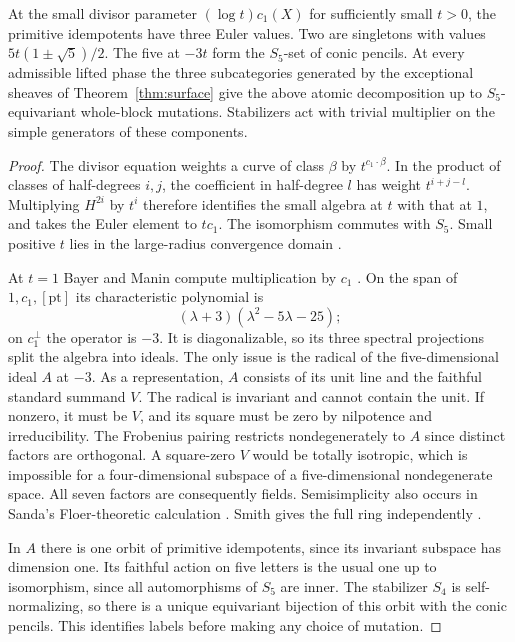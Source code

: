 \begin{proposition}\label{prop:quintic}
At the small divisor parameter $(\log t)c_1(X)$ for sufficiently small $t>0$, the primitive idempotents have three Euler values. Two are singletons with values $5t(1\pm\sqrt5)/2$. The five at $-3t$ form the $S_5$-set of conic pencils. At every admissible lifted phase the three subcategories generated by the exceptional sheaves of Theorem~\ref{thm:surface} give the above atomic decomposition up to $S_5$-equivariant whole-block mutations. Stabilizers act with trivial multiplier on the simple generators of these components.
\end{proposition}

\begin{proof}
The divisor equation weights a curve of class $\beta$ by $t^{c_1\cdot\beta}$. In the product of classes of half-degrees $i,j$, the coefficient in half-degree $l$ has weight $t^{i+j-l}$. Multiplying $H^{2i}$ by $t^i$ therefore identifies the small algebra at $t$ with that at $1$, and takes the Euler element to $tc_1$. The isomorphism commutes with $S_5$. Small positive $t$ lies in the large-radius convergence domain \cite[Remark~2.1]{HKLS}.

At $t=1$ Bayer and Manin compute multiplication by $c_1$ \cite[Table~3.5.3 and Proposition~3.5.4]{BM}. On the span of $1,c_1,[\mathrm{pt}]$ its characteristic polynomial is
\[
                    (\lambda+3)(\lambda^2-5\lambda-25);
\]
on $c_1^\perp$ the operator is $-3$. It is diagonalizable, so its three spectral projections split the algebra into ideals. The only issue is the radical of the five-dimensional ideal $A$ at $-3$. As a representation, $A$ consists of its unit line and the faithful standard summand $V$. The radical is invariant and cannot contain the unit. If nonzero, it must be $V$, and its square must be zero by nilpotence and irreducibility. The Frobenius pairing restricts nondegenerately to $A$ since distinct factors are orthogonal. A square-zero $V$ would be totally isotropic, which is impossible for a four-dimensional subspace of a five-dimensional nondegenerate space. All seven factors are consequently fields. Semisimplicity also occurs in Sanda's Floer-theoretic calculation \cite[\S6.2]{Sanda}. Smith gives the full ring independently \cite[\S4.3]{Smith}.

In $A$ there is one orbit of primitive idempotents, since its invariant subspace has dimension one. Its faithful action on five letters is the usual one up to isomorphism, since all automorphisms of $S_5$ are inner. The stabilizer $S_4$ is self-normalizing, so there is a unique equivariant bijection of this orbit with the conic pencils. This identifies labels before making any choice of mutation.


\end{proof}
